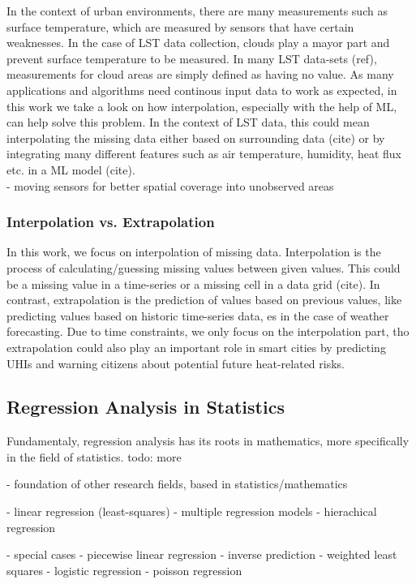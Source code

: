 In the context of urban environments, there are many measurements such as surface temperature, which are measured by sensors that have certain weaknesses. In the case of LST data collection, clouds play a mayor part and prevent surface temperature to be measured. In many LST data-sets (ref), measurements for cloud areas are simply defined as having no value. As many applications and algorithms need continous input data to work as expected, in this work we take a look on how interpolation, especially with the help of ML, can help solve this problem. In the context of LST data, this could mean interpolating the missing data either based on surrounding data (cite) or by integrating many different features such as air temperature, humidity, heat flux etc. in a ML model (cite).\\
- moving sensors for better spatial coverage into unobserved areas

\subsubsection{Interpolation vs. Extrapolation}

In this work, we focus on interpolation of missing data. Interpolation is the process of calculating/guessing missing values between given values. This could be a missing value in a time-series or a missing cell in a data grid (cite). In contrast, extrapolation is the prediction of values based on previous values, like predicting values based on historic time-series data, es in the case of weather forecasting. Due to time constraints, we only focus on the interpolation part, tho extrapolation could also play an important role in smart cities by predicting UHIs and warning citizens about potential future heat-related risks.

\subsection{Regression Analysis in Statistics}

Fundamentaly, regression analysis has its roots in mathematics, more specifically in the field of statistics.
todo: more

- foundation of other research fields, based in statistics/mathematics

- linear regression (least-squares)
- multiple regression models
- hierachical regression

- special cases
    - piecewise linear regression
    - inverse prediction
    - weighted least squares
    - logistic regression
    - poisson regression

